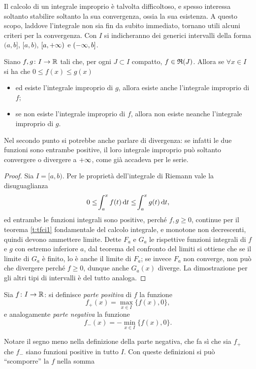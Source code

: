 Il calcolo di un integrale improprio è talvolta difficoltoso, e spesso interessa soltanto stabilire soltanto la sua convergenza, ossia la sua esistenza. A questo scopo, laddove l'integrale non sia fin da subito immediato, tornano utili alcuni criteri per la convergenza. Con $I$ si indicheranno dei generici intervalli della forma $(a,b]$, $[a,b)$, $[a,+\infty)$ e $(-\infty,b]$.
\begin{teorema} \label{t:confronto_int1}
	Siano $f,g\colon I\to\mathbb{R}$ tali che, per ogni $J\subset I$ compatto, $f\in\mathfrak{R}(J)$. Allora se $\forall x\in I$ si ha che $0\leq f(x)\leq g(x)$
	\begin{itemize}
		\item ed esiste l'integrale improprio di $g$, allora esiste anche l'integrale improprio di $f$;
		\item se non esiste l'integrale improprio di $f$, allora non esiste neanche l'integrale improprio di $g$.
	\end{itemize}
\end{teorema}
Nel secondo punto si potrebbe anche parlare di divergenza: se infatti le due funzioni sono entrambe positive, il loro integrale improprio può soltanto convergere o divergere a $+\infty$, come già accadeva per le serie.
\begin{proof}
	Sia $I=[a,b)$. Per le proprietà dell'integrale di Riemann vale la disuguaglianza
	\[
	0\leq\!\int_a^xf(t)\,\textup{d} t\leq\!\int_a^xg(t)\,\textup{d} t,
	\]
	ed entrambe le funzioni integrali sono positive, perché $f,g\geq 0$, continue per il teorema \ref{t:tfci1} fondamentale del calcolo integrale, e monotone non decrescenti, quindi devono ammettere limite.
	Dette $F_a$ e $G_a$ le rispettive funzioni integrali di $f$ e $g$ con estremo inferiore $a$, dal teorema del confronto del limiti si ottiene che se il limite di $G_a$ è finito, lo è anche il limite di $F_a$; se invece $F_a$ non converge, non può che divergere perché $f\ge 0$, dunque anche $G_a(x)$ diverge.
	La dimostrazione per gli altri tipi di intervalli è del tutto analoga.
\end{proof}
\begin{definizione}
Sia $f\colon I\to\mathbb{R}$: si definisce \emph{parte positiva} di $f$ la funzione
\[
f_+(x)=\max_{x\in I}\{f(x),0\},
\]
e analogamente \emph{parte negativa} la funzione
\[
f_-(x)=-\min_{x\in I}\{f(x),0\}.
\]
\end{definizione}
Notare il segno meno nella definizione della parte negativa, che fa sì che sia $f_+$ che $f_-$ siano funzioni positive in tutto $I$. Con queste definizioni si può ``scomporre'' la $f$ nella somma

